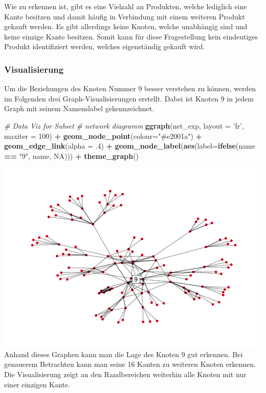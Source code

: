 \documentclass[
  12 pt,
]{article}
\newenvironment{Shaded}{\begin{snugshade}}{\end{snugshade}}
\newcommand{\CommentTok}[1]{\textcolor[rgb]{0.56,0.35,0.01}{\textit{#1}}}
\newcommand{\DataTypeTok}[1]{\textcolor[rgb]{0.13,0.29,0.53}{#1}}
\newcommand{\DecValTok}[1]{\textcolor[rgb]{0.00,0.00,0.81}{#1}}
\newcommand{\FloatTok}[1]{\textcolor[rgb]{0.00,0.00,0.81}{#1}}
\newcommand{\KeywordTok}[1]{\textcolor[rgb]{0.13,0.29,0.53}{\textbf{#1}}}
\newcommand{\NormalTok}[1]{#1}
\newcommand{\OperatorTok}[1]{\textcolor[rgb]{0.81,0.36,0.00}{\textbf{#1}}}
\newcommand{\OtherTok}[1]{\textcolor[rgb]{0.56,0.35,0.01}{#1}}
\newcommand{\StringTok}[1]{\textcolor[rgb]{0.31,0.60,0.02}{#1}}
\begin{document}
Wie zu erkennen ist, gibt es eine Vielzahl an Produkten, welche
lediglich eine Kante besitzen und damit häufig in Verbindung mit einem
weiteren Produkt gekauft werden. Es gibt allerdings keine Knoten, welche
unabhängig sind und keine einzige Kante besitzen. Somit kann für diese
Fragestellung kein eindeutiges Produkt identifiziert werden, welches
eigenständig gekauft wird.

\newpage

\hypertarget{visualisierung}{%
\subsubsection{Visualisierung}\label{visualisierung}}

Um die Beziehungen des Knoten Nummer 9 besser verstehen zu können,
werden im Folgenden drei Graph-Visualisierungen erstellt. Dabei ist
Knoten 9 in jedem Graph mit seinem Namenslabel gekennzeichnet.\\

\begin{Shaded}
\begin{Highlighting}[]
\CommentTok{# Data Viz for Subset}
\CommentTok{# network diagramm}
\KeywordTok{ggraph}\NormalTok{(net_exp, }\DataTypeTok{layout =} \StringTok{'fr'}\NormalTok{, }\DataTypeTok{maxiter =} \DecValTok{100}\NormalTok{) }\OperatorTok{+}\StringTok{ }
\StringTok{  }\KeywordTok{geom_node_point}\NormalTok{(}\DataTypeTok{colour=}\StringTok{"#e2001a"}\NormalTok{) }\OperatorTok{+}\StringTok{ }
\StringTok{  }\KeywordTok{geom_edge_link}\NormalTok{(}\DataTypeTok{alpha =} \FloatTok{.4}\NormalTok{) }\OperatorTok{+}
\StringTok{  }\KeywordTok{geom_node_label}\NormalTok{(}\KeywordTok{aes}\NormalTok{(}\DataTypeTok{label=}\KeywordTok{ifelse}\NormalTok{(name }\OperatorTok{==}\StringTok{ "9"}\NormalTok{, name, }\OtherTok{NA}\NormalTok{))) }\OperatorTok{+}
\StringTok{  }\KeywordTok{theme_graph}\NormalTok{()}
\end{Highlighting}
\end{Shaded}

\includegraphics{BUBECK_FERDINAND_SNA_Assignment_files/figure-latex/unnamed-chunk-2-1.pdf}
Anhand dieses Graphen kann man die Lage des Knoten 9 gut erkennen. Bei
genauerem Betrachten kann man seine 16 Kanten zu weiteren Knoten
erkennen. Die Visualisierung zeigt an den Randbereichen weiterhin alle
Knoten mit nur einer einzigen Kante.
\end{document}
